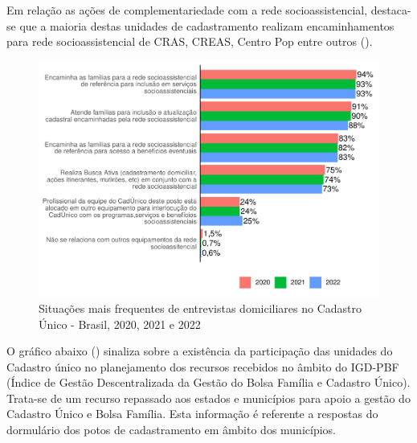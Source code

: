 \documentclass[
  brazilian]{report}
\begin{document}
Em relação as ações de complementariedade com a rede socioassistencial,
destaca-se que a maioria destas unidades de cadastramento realizam
encaminhamentos para rede socioassistencial de CRAS, CREAS, Centro Pop
entre outros ().

\begin{figure}
\includegraphics{Censo-SUAS-2022_files/figure-latex/redesuas-1} \caption[Situações mais frequentes de entrevistas domiciliares no Cadastro Único - Brasil, 2020, 2021 e 2022]{Situações mais frequentes de entrevistas domiciliares no Cadastro Único - Brasil, 2020, 2021 e 2022}\label{fig:redesuas}
\end{figure}

O gráfico abaixo () sinaliza sobre a existência da
participação das unidades do Cadastro único no planejamento dos recursos
recebidos no âmbito do IGD-PBF (Índice de Gestão Descentralizada da
Gestão do Bolsa Família e Cadastro Único). Trata-se de um recurso
repassado aos estados e municípios para apoio a gestão do Cadastro Único
e Bolsa Família. Esta informação é referente a respostas do dormulário
dos potos de cadastramento em âmbito dos municípios.
\end{document}
